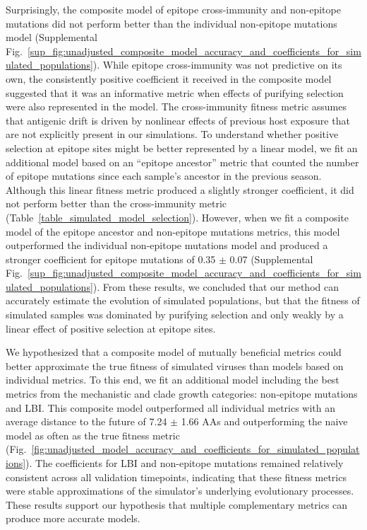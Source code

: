 Surprisingly, the composite model of epitope cross-immunity and non-epitope mutations did not perform better than the individual non-epitope mutations model (Supplemental Fig.~\ref{sup_fig:unadjusted_composite_model_accuracy_and_coefficients_for_simulated_populations}).
While epitope cross-immunity was not predictive on its own, the consistently positive coefficient it received in the composite model suggested that it was an informative metric when effects of purifying selection were also represented in the model.
The cross-immunity fitness metric assumes that antigenic drift is driven by nonlinear effects of previous host exposure \cite{Luksza:2014hj} that are not explicitly present in our simulations.
To understand whether positive selection at epitope sites might be better represented by a linear model, we fit an additional model based on an ``epitope ancestor'' metric that counted the number of epitope mutations since each sample's ancestor in the previous season.
Although this linear fitness metric produced a slightly stronger coefficient, it did not perform better than the cross-immunity metric (Table~\ref{table_simulated_model_selection}).
However, when we fit a composite model of the epitope ancestor and non-epitope mutations metrics, this model outperformed the individual non-epitope mutations model and produced a stronger coefficient for epitope mutations of 0.35 $\pm$ 0.07 (Supplemental Fig.~\ref{sup_fig:unadjusted_composite_model_accuracy_and_coefficients_for_simulated_populations}).
From these results, we concluded that our method can accurately estimate the evolution of simulated populations, but that the fitness of simulated samples was dominated by purifying selection and only weakly by a linear effect of positive selection at epitope sites.

We hypothesized that a composite model of mutually beneficial metrics could better approximate the true fitness of simulated viruses than models based on individual metrics.
To this end, we fit an additional model including the best metrics from the mechanistic and clade growth categories: non-epitope mutations and LBI.
This composite model outperformed all individual metrics with an average distance to the future of 7.24 $\pm$ 1.66 AAs and outperforming the naive model as often as the true fitness metric (Fig.~\ref{fig:unadjusted_model_accuracy_and_coefficients_for_simulated_populations}).
The coefficients for LBI and non-epitope mutations remained relatively consistent across all validation timepoints, indicating that these fitness metrics were stable approximations of the simulator's underlying evolutionary processes.
These results support our hypothesis that multiple complementary metrics can produce more accurate models.

